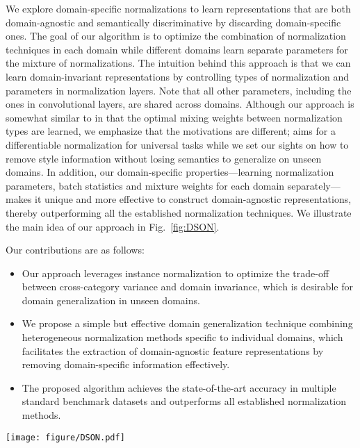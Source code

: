 \documentclass[runningheads]{llncs}
\begin{document}
We explore domain-specific normalizations to learn representations that are both domain-agnostic and semantically discriminative by discarding domain-specific ones.
The goal of our algorithm is to optimize the combination of normalization techniques in each domain while different domains learn separate parameters for the mixture of normalizations.
The intuition behind this approach is that we can learn domain-invariant representations by controlling types of normalization and parameters in normalization layers.
Note that all other parameters, including the ones in convolutional layers, are shared across domains. 
Although our approach is somewhat similar to \cite{sn} in that the optimal mixing weights between normalization types are learned, 
we emphasize that the motivations are different; \cite{sn} aims for a differentiable normalization for universal tasks while we set our sights on how to remove style information without losing semantics to generalize on unseen domains.
In addition, our domain-specific properties---learning normalization parameters, batch statistics and mixture weights for each domain separately--- makes it unique and more effective to construct domain-agnostic representations, thereby outperforming all the established normalization techniques.
We illustrate the main idea of our approach in Fig.~\ref{fig:DSON}.


Our contributions are as follows:
\begin{itemize}
\item[$\bullet$] Our approach leverages instance normalization to optimize the trade-off between cross-category variance and domain invariance, which is desirable for domain generalization in unseen domains.
\item[$\bullet$] We propose a simple but effective domain generalization technique combining heterogeneous normalization methods specific to individual domains, which facilitates the extraction of domain-agnostic feature representations by removing domain-specific information effectively.
\item[$\bullet$] The proposed algorithm achieves the state-of-the-art accuracy in multiple standard benchmark datasets and outperforms all established normalization methods.
\end{itemize}


\begin{figure*}[t]
\centering
	\texttt{[image: figure/DSON.pdf]}
   \caption{Illustration of Domain Specific Optimized Normalization (DSON). Each domain maintains domain-specific batch normalization statistics and affine parameters, as well as mixture weights.
}
    \label{fig:DSON}
\end{figure*}
\end{document}
